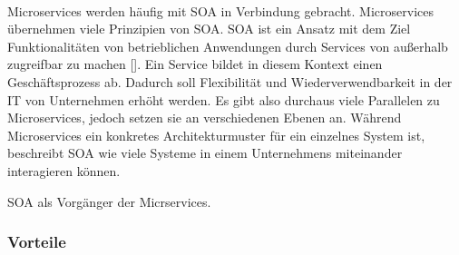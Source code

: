 \\
Microservices werden häufig mit \ac{SOA} in Verbindung gebracht. Microservices übernehmen viele Prinzipien von \ac{SOA}. \ac{SOA} ist ein Ansatz mit dem Ziel Funktionalitäten von betrieblichen Anwendungen durch Services von außerhalb zugreifbar zu machen [\cite[S. 2]{wolffMicroservices2018}]. Ein Service bildet in diesem Kontext einen Geschäftsprozess ab. Dadurch soll Flexibilität und Wiederverwendbarkeit in der IT von Unternehmen erhöht werden. Es gibt also durchaus viele Parallelen zu Microservices, jedoch setzen sie an verschiedenen Ebenen an. Während Microservices ein konkretes Architekturmuster für ein einzelnes System ist, beschreibt \ac{SOA} wie viele Systeme in einem Unternehmens miteinander interagieren können.

SOA als Vorgänger der Micrservices.

\subsubsection{Vorteile}

